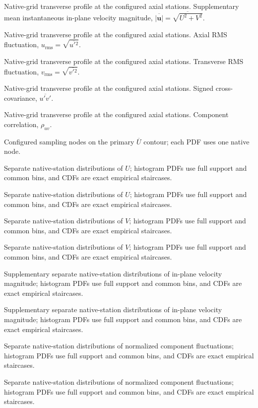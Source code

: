 \caption{Native-grid transverse profile at the configured axial stations. Supplementary mean instantaneous in-plane velocity magnitude, $\overline{|\mathbf{u}|}=\overline{\sqrt{U^{2}+V^{2}}}$.}

\caption{Native-grid transverse profile at the configured axial stations. Axial RMS fluctuation, $u_{\mathrm{rms}}=\sqrt{\overline{u\prime{}^2}}$.}

\caption{Native-grid transverse profile at the configured axial stations. Transverse RMS fluctuation, $v_{\mathrm{rms}}=\sqrt{\overline{v\prime{}^2}}$.}

\caption{Native-grid transverse profile at the configured axial stations. Signed cross-covariance, $\overline{u\prime v\prime}$.}

\caption{Native-grid transverse profile at the configured axial stations. Component correlation, $\rho_{uv}$.}

\caption{Configured sampling nodes on the primary $\overline{U}$ contour; each PDF uses one native node.}

\caption{Separate native-station distributions of $U$; histogram PDFs use full support and common bins, and CDFs are exact empirical staircases.}

\caption{Separate native-station distributions of $U$; histogram PDFs use full support and common bins, and CDFs are exact empirical staircases.}

\caption{Separate native-station distributions of $V$; histogram PDFs use full support and common bins, and CDFs are exact empirical staircases.}

\caption{Separate native-station distributions of $V$; histogram PDFs use full support and common bins, and CDFs are exact empirical staircases.}

\caption{Supplementary separate native-station distributions of in-plane velocity magnitude; histogram PDFs use full support and common bins, and CDFs are exact empirical staircases.}

\caption{Supplementary separate native-station distributions of in-plane velocity magnitude; histogram PDFs use full support and common bins, and CDFs are exact empirical staircases.}

\caption{Separate native-station distributions of normalized component fluctuations; histogram PDFs use full support and common bins, and CDFs are exact empirical staircases.}

\caption{Separate native-station distributions of normalized component fluctuations; histogram PDFs use full support and common bins, and CDFs are exact empirical staircases.}
